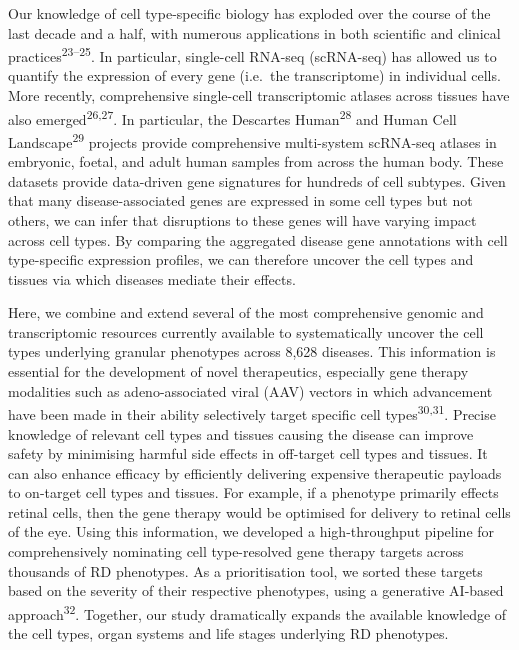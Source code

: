 \documentclass[
]{report}
\begin{document}
Our knowledge of cell type-specific biology has exploded over the course
of the last decade and a half, with numerous applications in both
scientific and clinical practices\textsuperscript{23--25}. In
particular, single-cell RNA-seq (scRNA-seq) has allowed us to quantify
the expression of every gene (i.e.~the transcriptome) in individual
cells. More recently, comprehensive single-cell transcriptomic atlases
across tissues have also emerged\textsuperscript{26,27}. In particular,
the Descartes Human\textsuperscript{28} and Human Cell
Landscape\textsuperscript{29} projects provide comprehensive
multi-system scRNA-seq atlases in embryonic, foetal, and adult human
samples from across the human body. These datasets provide data-driven
gene signatures for hundreds of cell subtypes. Given that many
disease-associated genes are expressed in some cell types but not
others, we can infer that disruptions to these genes will have varying
impact across cell types. By comparing the aggregated disease gene
annotations with cell type-specific expression profiles, we can
therefore uncover the cell types and tissues via which diseases mediate
their effects.

Here, we combine and extend several of the most comprehensive genomic
and transcriptomic resources currently available to systematically
uncover the cell types underlying granular phenotypes across 8,628
diseases. This information is essential for the development of novel
therapeutics, especially gene therapy modalities such as
adeno-associated viral (AAV) vectors in which advancement have been made
in their ability selectively target specific cell
types\textsuperscript{30,31}. Precise knowledge of relevant cell types
and tissues causing the disease can improve safety by minimising harmful
side effects in off-target cell types and tissues. It can also enhance
efficacy by efficiently delivering expensive therapeutic payloads to
on-target cell types and tissues. For example, if a phenotype primarily
effects retinal cells, then the gene therapy would be optimised for
delivery to retinal cells of the eye. Using this information, we
developed a high-throughput pipeline for comprehensively nominating cell
type-resolved gene therapy targets across thousands of RD phenotypes. As
a prioritisation tool, we sorted these targets based on the severity of
their respective phenotypes, using a generative AI-based
approach\textsuperscript{32}. Together, our study dramatically expands
the available knowledge of the cell types, organ systems and life stages
underlying RD phenotypes.
\end{document}
